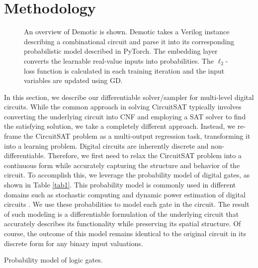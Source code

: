 \section{Methodology}
 

\begin{figure*}[t]
    \centering
    \scalebox{0.9}{
    }
    \caption{An overview of {\sc Demotic} is shown. {\sc Demotic} takes a Verilog instance describing a combinational circuit and parse it into its corresponding probabilistic model described in PyTorch. The embedding layer converts the learnable real-value inputs into probabilities. The $\ell_2$-loss function is calculated in each training iteration and the input variables are updated using GD.}
    \label{fig1}
\end{figure*}


In this section, we describe our differentiable solver/sampler for multi-level digital circuits. While the common approach in solving CircuitSAT typically involves converting the underlying circuit into CNF and employing a SAT solver to find the satisfying solution, we take a completely different approach. Instead, we re-frame the CircuitSAT problem as a multi-output regression task, transforming it into a learning problem. Digital circuits are inherently discrete and non-differentiable. Therefore, we first need to relax the CircuitSAT problem into a continuous form while accurately capturing the structure and behavior of the circuit. To accomplish this, we leverage the probability model of digital gates, as shown in Table \ref{tab1}. This probability model is commonly used in different domains such as stochastic computing \cite{Ardakani2017SC} and dynamic power estimation of digital circuits \cite{harris2010cmos}. We use these probabilities to model each gate in the circuit. The result of such modeling is a differentiable formulation of the underlying circuit that accurately describes its functionality while preserving its spatial structure. Of course, the outcome of this model remains identical to the original circuit in its discrete form for any binary input valuations.




\begin{table}[t]
    \centering
    \caption{Probability model of logic gates.}
    \vspace{-0.25cm}
    
    \label{tab1}
    \vspace{-0.25cm}
\end{table}







